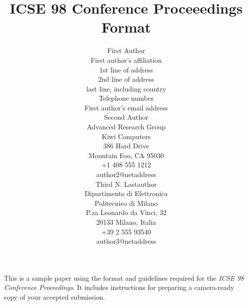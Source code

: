 
\pagestyle{empty}


\title{ICSE 98 Conference Proceeedings Format}

\author{
        \hspace*{-2ex}
        \parbox{2.3in} {\begin{center}
        {\authornamefont First Author}\\ 
        First author's affiliation\\
        1st line of address\\
        2nd line of address\\
        last line, including country \\
        Telephone number\\
        First author's email address
        \end{center} }
        \parbox{2.3in} {\begin{center}
        {\authornamefont Second Author}\\
        Advanced Research Group\\
        Kiwi Computers\\
        386 Hard Drive\\
        Mountain Foo, CA  95030\\
        +1 408 555 1212\\
        author2@netaddress
        \end{center} }
        \parbox{2.3in} {\begin{center}
        {\authornamefont Third N. Lastauthor}\\
        Dipartimento di Elettronica\\
        Politecnico di Milano\\
        P.za Leonardo da Vinci, 32\\
        20133 Milano, Italia\\
        +39 2 555 93540\\
        author3@netaddress
        \end{center} }
}

\maketitle
\copyrightspace

\abstract
This is a sample paper using the format and guidelines 
required for the {\it ICSE 98 Conference Proceedings}. It 
includes instructions for preparing a camera-ready copy of 
your accepted submission.

